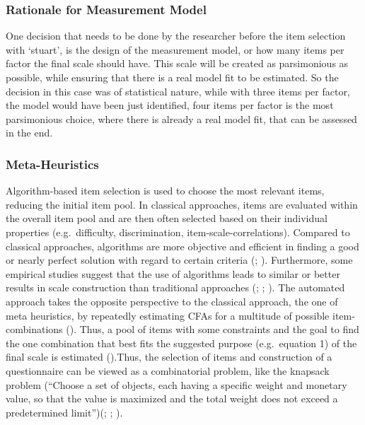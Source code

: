 \documentclass[
  12pt,
  a4paper,
  twoside]{article}
\begin{document}
\subsubsection{Rationale for Measurement Model}\label{rationale-for-measurement-model}

One decision that needs to be done by the researcher before the item selection with `stuart', is the design of the measurement model, or how many items per factor the final scale should have.
This scale will be created as parsimonious as possible, while ensuring that there is a real model fit to be estimated. So the decision in this case was of statistical nature, while with three items per factor, the model would have been just identified, four items per factor is the most parsimonious choice, where there is already a real model fit, that can be assessed in the end.

\subsubsection{Meta-Heuristics}\label{meta-heuristics}

Algorithm-based item selection is used to choose the most relevant items, reducing the initial item pool. In classical approaches, items are evaluated within the overall item pool and are then often selected based on their individual properties (e.g.~difficulty, discrimination, item-scale-correlations).
Compared to classical approaches, algorithms are more objective and efficient in finding a good or nearly perfect solution with regard to certain criteria (; ). Furthermore, some empirical studies suggest that the use of algorithms leads to similar or better results in scale construction than traditional approaches (; ; ). The automated approach takes the opposite perspective to the classical approach, the one of meta heuristics, by repeatedly estimating CFAs for a multitude of possible item-combinations (). Thus, a pool of items with some constraints and the goal to find the one combination that best fits the suggested purpose (e.g.~equation 1) of the final scale is estimated ().Thus, the selection of items and construction of a questionnaire can be viewed as a combinatorial problem, like the knapsack problem (``Choose a set of objects, each having a specific weight and monetary value, so that the value is maximized and the total weight does not exceed a predetermined limit'')(; ; ).
\end{document}
